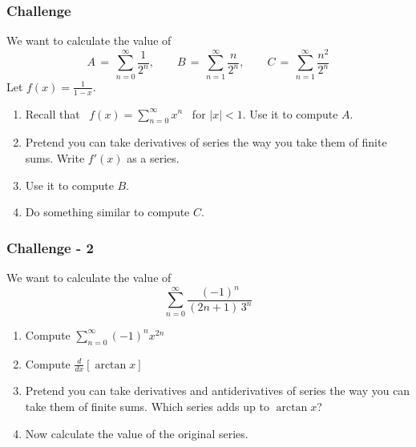 \documentclass[14pt]{beamer}
\begin{document}
	\begin{frame}[t]
		\fontsize{13}{13}\selectfont
		\frametitle{Challenge}

		We want to calculate the value of
		\[
			A \, = \, \sum_{n=0}^{\infty}\frac{1}{2^{n}}, \quad \quad B \, = \, \sum_{n=1}
			^{\infty}\frac{n}{2^{n}}, \quad \quad C \, = \, \sum_{n=1}^{\infty}\frac{n^{2}}{2^{n}}
		\]
		Let $\displaystyle f(x)= \frac{1}{1-x}$.

		\hrulefill

		\begin{enumerate}
			\item Recall that \, $\displaystyle f(x) = \sum_{n=0}^{\infty}x^{n}$ \, for
				$\displaystyle |x|<1$. Use it to compute $A$.

			\item Pretend you can take derivatives of series the way you take them of finite
				sums. Write $\displaystyle f'(x)$ as a series.
				\vspace{.2cm}

			\item Use it to compute $B$.
				\vspace{.2cm}

			\item Do something similar to compute $C$.
		\end{enumerate}
	\end{frame}

	\begin{frame}[t]
		\fontsize{13}{13}\selectfont
		\frametitle{Challenge - 2}

		We want to calculate the value of
		\[
			\sum_{n=0}^{\infty}\frac{(-1)^{n}}{(2n+1) \, 3^{n}}
		\]

		\hrulefill

		\begin{enumerate}
			\item Compute $\displaystyle \sum_{n=0}^{\infty}(-1)^{n}x^{2n}$

			\item Compute $\displaystyle \frac{d}{dx}\left[ \arctan x \right]$
				\vspace{.2cm}

			\item Pretend you can take derivatives and antiderivatives of series the way
				you can take them of finite sums. Which series adds up to
				$\displaystyle \arctan x$?
				\vspace{.2cm}

			\item Now calculate the value of the original series.
		\end{enumerate}
	\end{frame}
\end{document}

